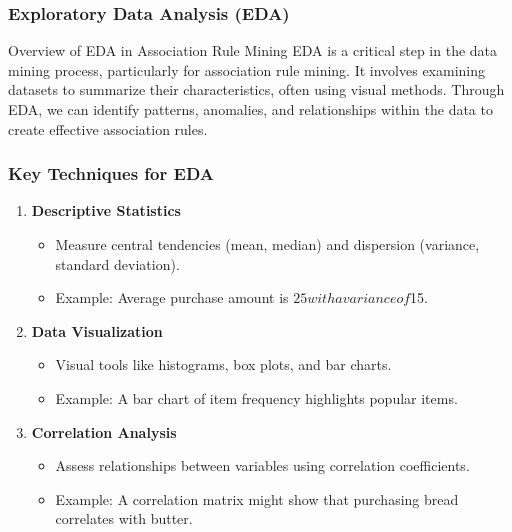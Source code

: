 \documentclass{beamer}
\begin{document}
\begin{frame}
    \frametitle{Exploratory Data Analysis (EDA)}
    \begin{block}{Overview of EDA in Association Rule Mining}
        EDA is a critical step in the data mining process, particularly for association rule mining. It involves examining datasets to summarize their characteristics, often using visual methods. Through EDA, we can identify patterns, anomalies, and relationships within the data to create effective association rules.
    \end{block}
\end{frame}

\begin{frame}
    \frametitle{Key Techniques for EDA}
    \begin{enumerate}
        \item \textbf{Descriptive Statistics}
        \begin{itemize}
            \item Measure central tendencies (mean, median) and dispersion (variance, standard deviation).
            \item Example: Average purchase amount is $25 with a variance of $15.
        \end{itemize}
        
        \item \textbf{Data Visualization}
        \begin{itemize}
            \item Visual tools like histograms, box plots, and bar charts.
            \item Example: A bar chart of item frequency highlights popular items.
        \end{itemize}
        
        \item \textbf{Correlation Analysis}
        \begin{itemize}
            \item Assess relationships between variables using correlation coefficients.
            \item Example: A correlation matrix might show that purchasing bread correlates with butter.
        \end{itemize}
    \end{enumerate}
\end{frame}
\end{document}
